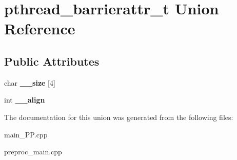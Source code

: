 \hypertarget{unionpthread__barrierattr__t}{\section{pthread\+\_\+barrierattr\+\_\+t Union Reference}
\label{unionpthread__barrierattr__t}
}
\subsection*{Public Attributes}
\begin{DoxyCompactItemize}
\item 
\hypertarget{unionpthread__barrierattr__t_af6bc84b5d92818e324085b9fce792573}{char {\bfseries \+\_\+\+\_\+size} \mbox{[}4\mbox{]}}\label{unionpthread__barrierattr__t_af6bc84b5d92818e324085b9fce792573}

\item 
\hypertarget{unionpthread__barrierattr__t_affc673be91f5bb300851cd5b49d1f9e8}{int {\bfseries \+\_\+\+\_\+align}}\label{unionpthread__barrierattr__t_affc673be91f5bb300851cd5b49d1f9e8}

\end{DoxyCompactItemize}


The documentation for this union was generated from the following files\+:\begin{DoxyCompactItemize}
\item 
main\+\_\+\+P\+P.\+cpp\item 
preproc\+\_\+main.\+cpp\end{DoxyCompactItemize}

